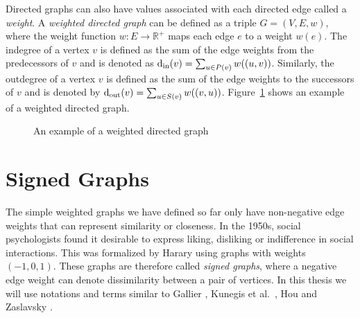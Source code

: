 Directed graphs can also have values associated with each directed edge called a \textit{weight}.
A \textit{weighted directed graph} can be defined as a triple $G=(V,E,w)$, where the weight function $w:E \rightarrow \mathbb{R}^{+}$ maps each edge $e$ to a weight $w(e)$.
The indegree of a vertex $v$ is defined as the sum of the edge weights from the predecessors of $v$ and is denoted as $\operatorname*{d_{\text{in}}}(v) = \sum_{u \in P(v)} w((u,v))$.
Similarly, the outdegree of a vertex $v$ is defined as the sum of the edge weights to the successors of $v$ and is denoted by $\operatorname*{d_{\text{out}}}(v) = \sum_{u \in S(v)}w((v,u))$.
Figure~\ref{fig:weighted-directed} shows an example of a weighted directed graph.

\begin{figure}[!ht]
    \centering
    
    \caption{An example of a weighted directed graph}
    \label{fig:weighted-directed}
\end{figure}

\section{Signed Graphs}
\label{sec:signed-graphs}
The simple weighted graphs we have defined so far only have non-negative edge weights that can represent similarity or closeness.
In the 1950s, social psychologists found it desirable to express liking, disliking or indifference in social interactions.
This was formalized by Harary \cite{harary1953on} using graphs with weights $(-1,0,1)$.
These graphs are therefore called \textit{signed graphs}, where a negative edge weight can denote dissimilarity between a pair of vertices.
In this thesis we will use notations and terms similar to Gallier \cite{gallier2016spectral}, Kunegis et al.\ \cite{kunegis2010spectral}, Hou \cite{hou2005bounds} and Zaslavsky \cite{zaslavsky1982signed}.


